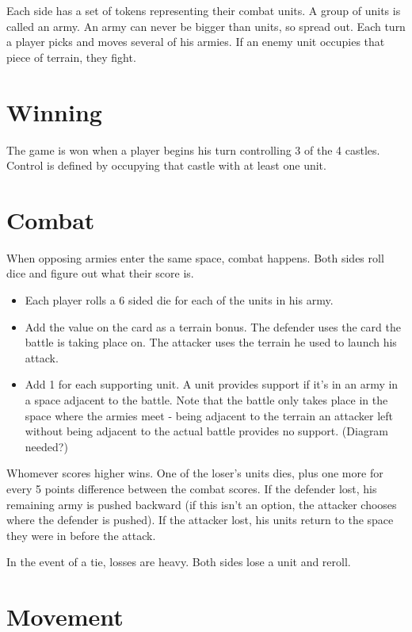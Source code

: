 \documentclass{article}
\begin{document}
Each side has a set of \reinforcements tokens representing their combat units.  A group of units is called an army.  An army can never be bigger than \maxarmy units, so spread out.  Each turn a player picks and moves several of his armies.  If an enemy unit occupies that piece of terrain, they fight.

\section{Winning}

The game is won when a player begins his turn controlling 3 of the 4 castles.  Control is defined by occupying that castle with at least one unit.

\section{Combat}

When opposing armies enter the same space, combat happens.  Both sides roll dice and figure out what their score is.  

\begin{itemize}
  \item Each player rolls a 6 sided die for each of the units in his army.  
  \item Add the value on the card as a terrain bonus.  The defender uses the card the battle is taking place on.  The attacker uses the terrain he used to launch his attack.
  \item Add 1 for each supporting unit.  A unit provides support if it's in an army in a space adjacent to the battle.  Note that the battle only takes place in the space where the armies meet - being adjacent to the terrain an attacker left without being adjacent to the actual battle provides no support.  (Diagram needed?)
\end{itemize}

Whomever scores higher wins.  One of the loser's units dies, plus one more for every 5 points difference between the combat scores.  If the defender lost, his remaining army is pushed backward (if this isn't an option, the attacker chooses where the defender is pushed).  If the attacker lost, his units return to the space they were in before the attack.

In the event of a tie, losses are heavy.  Both sides lose a unit and reroll.

\section{Movement}
\end{document}
